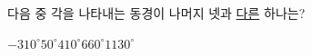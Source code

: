 다음 중 각을 나타내는 동경이 나머지 넷과 \underline{다른} 하나는?
\begin{choices32}{$-310^\circ$}{$50^\circ$}{$410^\circ$}{$660^\circ$}{$1130^\circ$}\end{choices32}
